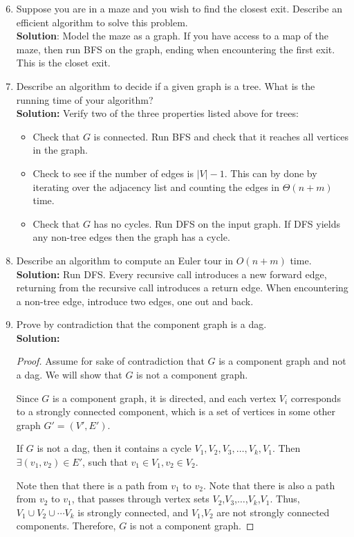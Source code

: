 \documentclass[letterpaper,11pt]{article}
\begin{document}
\begin{enumerate}
\setcounter{enumi}{5}
\item Suppose you are in a maze and you wish to find the closest exit. Describe an efficient algorithm to solve this problem.\\

\textbf{Solution}: Model the maze as a graph. If you have access to a map of the maze, then run BFS on the graph, ending when encountering the first exit. This is the closet exit.

\item Describe an algorithm to decide if a given graph is a tree. What is the running time of your algorithm?\\

\textbf{Solution:} Verify two of the three properties listed above for trees:
\begin{itemize}
\item Check that $G$ is connected. Run BFS and check that it reaches all vertices in the graph.
\item Check to see if the number of edges is $|V|-1$. This can by done by iterating over the adjacency list and counting the edges in $\Theta(n + m)$ time.
\item Check that $G$ has no cycles. Run DFS on the input graph. If DFS yields any non-tree edges then the graph has a cycle.
\end{itemize}
\newpage
\item Describe an algorithm to compute an Euler tour in $O(n + m)$ time.\\

\textbf{Solution:} Run DFS. Every recursive call introduces a new forward edge, returning from the recursive call introduces a return edge. When encountering a non-tree edge, introduce two edges, one out and back.

\item Prove by contradiction that the component graph is a dag.\\

\textbf{Solution:} 
\begin{proof}
Assume for sake of contradiction that $G$ is a component graph and not a dag. We will show that $G$ is not a component graph.

Since $G$ is a component graph, it is directed, and each vertex $V_i$ corresponds to a strongly connected component, which is a set of vertices in some other graph $G' = (V',E')$.

If $G$ is not a dag, then it contains a cycle $V_1,V_2,V_3,\ldots,V_k,V_1$. Then $\exists (v_1,v_2)\in E'$, such that $v_1\in V_1, v_2\in V_2$.

Note then that there is a path from $v_1$ to $v_2$. Note that there is also a path from $v_2$ to $v_1$, that passes through vertex sets $V_2$,$V_3$,$\ldots$,$V_k$,$V_1$. Thus, $V_1\cup V_2\cup\cdots V_k$ is strongly connected, and $V_1$,$V_2$ are not strongly connected components. Therefore, $G$ is not a component graph.
\end{proof}
\end{enumerate}
\end{document}
